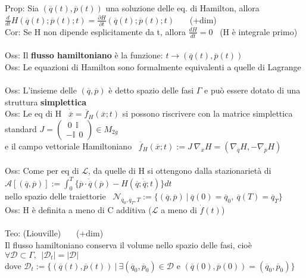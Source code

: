 \documentclass{article}
\theoremstyle{unnumbered}
\theoremstyle{unnumbered1}
\begin{document}
%
Prop: Sia $(\overline{q}(t),\overline{p}(t))$ una soluzione delle eq.\! di Hamilton, allora $\frac{d}{dt}H(\overline{q}(t);\overline{p}(t);t)=\frac{\partial H}{\partial t}(\overline{q}(t);\overline{p}(t);t)$ \ \ \ (+dim)\\
%
Cor: Se H non dipende esplicitamente da t, allora $\frac{dH}{dt}=0$ \ (H è integrale primo) \\ \\
%
%
%
Oss: Il \textbf{flusso hamiltoniano} è la funzione: $t\rightarrow (\overline{q}(t),\overline{p}(t))$\\
%
Oss: Le equazioni di Hamilton sono formalmente equivalenti a quelle di Lagrange \\ \\
%
%
%
Oss: L'insieme delle $(\overline{q},\overline{p})$ è detto spazio delle fasi $\Gamma$ e può essere dotato di una struttura \textbf{simplettica}\\
%
Oss: Le eq di H \ $\dot{\overline{x}}=\overline{f}_H (\overline{x};t)$ si possono riscrivere con la matrice simplettica standard $J=\begin{pmatrix}
    \ 0 \ \ \mathbb{I} \\
    -\mathbb{I} \ \ 0
\end{pmatrix} \in M_{2g}$\\
\phantom{Oss: }e il campo vettoriale Hamiltoniano \ $\overline{f}_H (\overline{x};t) := J \ \nabla_{\overline{x}}H =(\nabla_{\overline{q}}H , -\nabla_{\overline{p}}H) $ \\ \\
%
%
%
Oss: Come per eq di $\mathcal{L}$, da quelle di H si ottengono dalla stazionarietà di \ $\mathcal{A}[(\overline{q},\overline{p})]:=\int_0^T\{\overline{p}\cdot\dot{\overline{q}}(\overline{p}) - H(\overline{q};\dot{\overline{q}};t)\}dt$ \\
\phantom{Oss: }nello spazio delle traiettorie \ $\mathcal{N}_{\overline{q}_0,\overline{q}_T,T}:=\{ (\overline{q},\overline{p}) \ | \ \overline{q}(0)=\overline{q}_0 , \ \overline{q}(T)=\overline{q}_T \}$ \\
Oss: H è definita a meno di C additiva ($\mathcal{L}$ a meno di $\dot{f}(t)$) \\ \\
%
%
%
Teo: (Liouville) \ \ \ (+dim)\\
Il flusso hamiltoniano conserva il volume nello spazio delle fasi, cioè $\forall \mathcal{D}\subset\Gamma, \ \ |\mathcal{D}_t|=|\mathcal{D}|$ \\
dove $\mathcal{D}_t:=\{ (\overline{q}(t),\overline{p}(t)) \ | \ \exists (\overline{q}_0,\overline{p}_0)\in \mathcal{D} \text{ e } (\overline{q}(0),\overline{p}(0))=(\overline{q}_0,\overline{p}_0)  \}$ \\
\end{document}
